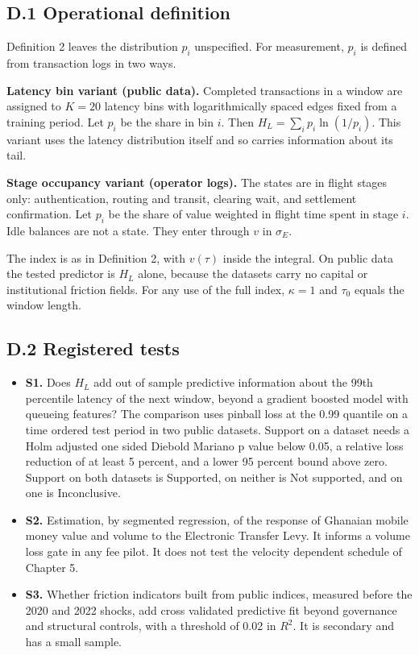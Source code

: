 \documentclass[11pt,a4paper]{article}
\theoremstyle{definition}
\theoremstyle{plain}
\theoremstyle{remark}
\begin{document}
\subsection*{D.1 Operational definition}
Definition 2 leaves the distribution $p_i$ unspecified. For measurement, $p_i$ is defined from transaction logs in two ways.

\textbf{Latency bin variant (public data).} Completed transactions in a window are assigned to $K=20$ latency bins with logarithmically spaced edges fixed from a training period. Let $p_i$ be the share in bin $i$. Then $H_L=\sum_i p_i\ln(1/p_i)$. This variant uses the latency distribution itself and so carries information about its tail.

\textbf{Stage occupancy variant (operator logs).} The states are in flight stages only: authentication, routing and transit, clearing wait, and settlement confirmation. Let $p_i$ be the share of value weighted in flight time spent in stage $i$. Idle balances are not a state. They enter through $v$ in $\sigma_E$.

The index is as in Definition 2, with $v(\tau)$ inside the integral. On public data the tested predictor is $H_L$ alone, because the datasets carry no capital or institutional friction fields. For any use of the full index, $\kappa=1$ and $\tau_0$ equals the window length.

\subsection*{D.2 Registered tests}
\begin{itemize}
\item \textbf{S1.} Does $H_L$ add out of sample predictive information about the 99th percentile latency of the next window, beyond a gradient boosted model with queueing features? The comparison uses pinball loss at the 0.99 quantile on a time ordered test period in two public datasets. Support on a dataset needs a Holm adjusted one sided Diebold Mariano p value below 0.05, a relative loss reduction of at least 5 percent, and a lower 95 percent bound above zero. Support on both datasets is Supported, on neither is Not supported, and on one is Inconclusive.
\item \textbf{S2.} Estimation, by segmented regression, of the response of Ghanaian mobile money value and volume to the Electronic Transfer Levy. It informs a volume loss gate in any fee pilot. It does not test the velocity dependent schedule of Chapter 5.
\item \textbf{S3.} Whether friction indicators built from public indices, measured before the 2020 and 2022 shocks, add cross validated predictive fit beyond governance and structural controls, with a threshold of 0.02 in $R^2$. It is secondary and has a small sample.
\end{itemize}
\end{document}
